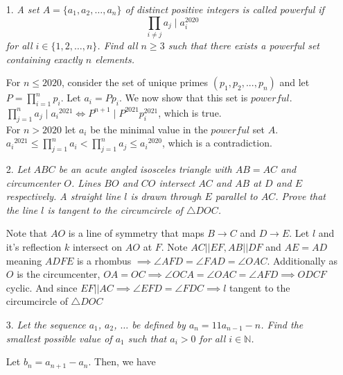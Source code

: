 \documentclass{article}
\begin{document}
\begin{enumerate}

\medskip
\item[1.] %
{\itshape A set $A = \{a_1, a_2, \dotsc, a_n\}$ of distinct positive integers is called \emph{powerful} if
\[ \prod_{i \neq j} a_j \mid a_i^{2020} \]
for all $i \in \{1, 2, \dotsc, n\}$.
Find all $n \ge 3$ such that there exists a powerful set containing exactly $n$ elements.}

For $n\leq2020$, consider the set of unique primes $(p_1,p_2,...,p_n)$ and let $P = \prod_{i=1}^{n} p_i$. Let $a_i = Pp_i$. We now show that this set is $powerful$.
\\$\prod_{j=1}^{n} a_j \mid {a_i}^{2021} \iff P^{n+1} \mid P^{2021}p_i^{2021}$, which is true.
\\For $n>2020$ let $a_i$ be the minimal value in the $powerful$ set $A$.
\\${a_i}^{2021} \leq \prod_{j=1}^{n} a_i <  \prod_{j=1}^{n} a_j \leq {a_i}^{2020}$, which is a contradiction.


\medskip
\item[2.] %
{\itshape Let $ABC$ be an acute angled isosceles triangle with $AB = AC$ and circumcenter $O$.
Lines $BO$ and $CO$ intersect $AC$ and $AB$ at $D$ and $E$ respectively.
A straight line $l$ is drawn through $E$ parallel to $AC$.
Prove that the line $l$ is tangent to the circumcircle of $\triangle DOC$.}

Note that $AO$ is a line of symmetry that maps $B\rightarrow C$ and $D\rightarrow E$. Let $l$ and it's reflection $k$ intersect on $AO$ at $F$.
Note $AC||EF, AB||DF$ and $AE=AD$ meaning $ADFE$ is a rhombus $\implies \angle AFD = \angle FAD = \angle OAC$.
Additionally as $O$ is the circumcenter, $OA = OC \implies \angle OCA = \angle OAC = \angle AFD \implies ODCF$ cyclic.
And since $EF||AC\implies\angle EFD = \angle FDC\implies l$ tangent to the circumcircle of $\triangle DOC$


\medskip
\item[3.] %
{\itshape Let the sequence $a_1$, $a_2$, $\dotsc$ be defined by $a_n = 11 a_{n - 1} - n$.
Find the smallest possible value of $a_1$ such that $a_i > 0$ for all $i \in \mathbb{N}$.}

Let $b_n = a_{n + 1} - a_n$. Then, we have


\end{enumerate}
\end{document}
